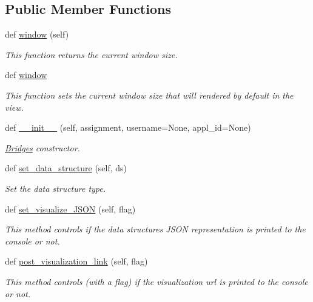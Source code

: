 \subsection*{Public Member Functions}
\begin{DoxyCompactItemize}
\item 
def \hyperlink{classbridges_1_1bridges_1_1_bridges_a1340374df9e4aa1490d9cd9be2b0e918}{window} (self)
\begin{DoxyCompactList}\small\item\em This function returns the current window size. \end{DoxyCompactList}\item 
def \hyperlink{classbridges_1_1bridges_1_1_bridges_ab434ee3f7b3b8c9eb4f8a07d97789a82}{window}
\begin{DoxyCompactList}\small\item\em This function sets the current window size that will rendered by default in the view. \end{DoxyCompactList}\item 
def \hyperlink{classbridges_1_1bridges_1_1_bridges_af40aff29a2bc4efbaeb4186275fe7480}{\+\_\+\+\_\+init\+\_\+\+\_\+} (self, assignment, username=None, appl\+\_\+id=None)
\begin{DoxyCompactList}\small\item\em \hyperlink{classbridges_1_1bridges_1_1_bridges}{Bridges} constructor. \end{DoxyCompactList}\item 
def \hyperlink{classbridges_1_1bridges_1_1_bridges_a868f02fa66c87c1a1fc7bd6fbc799291}{set\+\_\+data\+\_\+structure} (self, ds)
\begin{DoxyCompactList}\small\item\em Set the data structure type. \end{DoxyCompactList}\item 
def \hyperlink{classbridges_1_1bridges_1_1_bridges_ab50d018b5178ca33de24157b7b6de285}{set\+\_\+visualize\+\_\+\+J\+S\+ON} (self, flag)
\begin{DoxyCompactList}\small\item\em This method controls if the data structure\textquotesingle{}s J\+S\+ON representation is printed to the console or not. \end{DoxyCompactList}\item 
def \hyperlink{classbridges_1_1bridges_1_1_bridges_affea08c46fe175e8ed319b14db319fb1}{post\+\_\+visualization\+\_\+link} (self, flag)
\begin{DoxyCompactList}\small\item\em This method controls (with a flag) if the visualization url is printed to the console or not. \end{DoxyCompactList}\item 

\end{DoxyCompactItemize}

